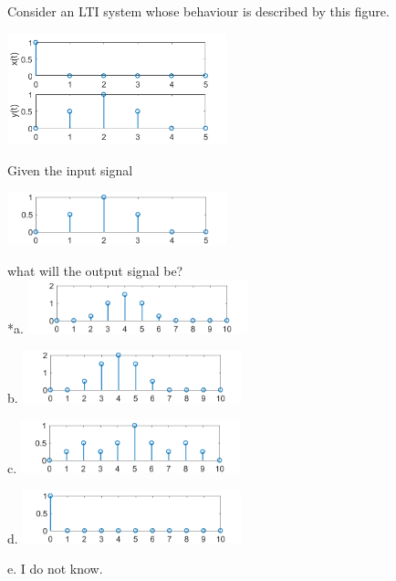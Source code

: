 
Consider an LTI system whose behaviour is described by this figure.

\includegraphics[width=2.5in]{../../Images/LTISystemsQ61.png}

Given the input signal

\includegraphics[width=2.5in]{../../Images/LTISystemsQ62.png}

what will the output signal be?\\

*a. 
\includegraphics[width=2.5in]{../../Images/LTISystemsQ6a.png}

b. 
\includegraphics[width=2.5in]{../../Images/LTISystemsQ6b.png}

c. 
\includegraphics[width=2.5in]{../../Images/LTISystemsQ6c.png}

d. 
\includegraphics[width=2.5in]{../../Images/LTISystemsQ6d.png}

e. I do not know.\\
